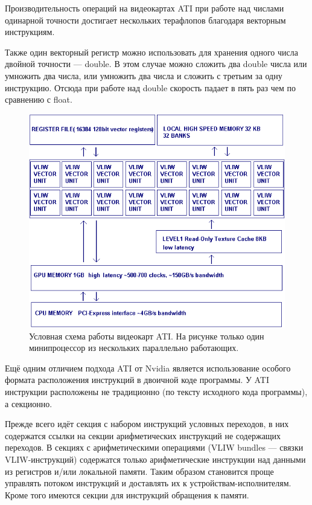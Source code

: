Производительность операций на видеокартах ATI при работе над числами одинарной точности достигает нескольких терафлопов благодаря векторным инструкциям.

Также один векторный регистр можно использовать для хранения одного числа двойной точности --- double. В этом случае можно сложить два double числа или умножить два числа, или умножить два числа и сложить с третьим за одну инструкцию. Отсюда при работе над double скорость падает в пять раз чем по сравнению с float. 

\begin{figure}[ht!]
\begin{center}
\includegraphics[width=0.8\linewidth]{img/radeon1.png}
\caption{Условная схема работы видеокарт ATI. На рисунке только один минипроцессор из нескольких параллельно работающих.}
\end{center}
\end{figure}

Ещё одним отличием подхода ATI от Nvidia является использование особого формата расположения инструкций в двоичной коде программы. У ATI инструкции расположены не традиционно (по тексту исходного кода программы), а секционно.

Прежде всего идёт секция с набором инструкций условных переходов, в них содержатся ссылки на секции арифметических инструкций не содержащих переходов. В секциях с арифметическими операциями (VLIW bundles --- связки VLIW-инструкций) содержатся только арифметические инструкции над данными из регистров и/или локальной памяти. Таким образом становится проще управлять потоком инструкций и доставлять их к устройствам-исполнителям. Кроме того имеются секции для инструкций обращения к памяти.

